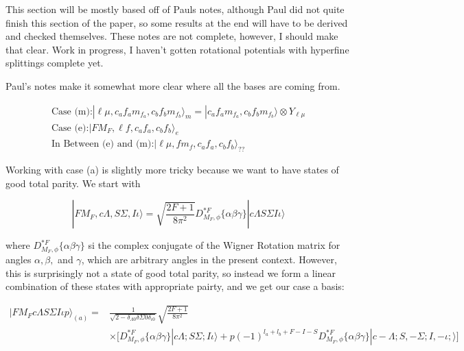 \documentclass[prl, longbibliography]{revtex4-2}
\begin{document}
This section will be mostly based off of Pauls notes, although Paul did not quite finish this section of the paper, so some results at the end will have to be derived and checked themselves. These notes are not complete, however, I should make that clear. Work in progress, I haven't gotten rotational potentials with hyperfine splittings complete yet. 

Paul's notes make it somewhat more clear where all the bases are coming from. 

\begin{equation}
\begin{split}
\text{Case (m):} |\ell \mu, c_a f_a m_{f_a}, c_b f_b m_{f_b}\rangle_m = |c_a f_a m_{f_a}, c_b f_b m_{f_b}\rangle\otimes Y_{\ell \mu}\\
\text{Case (e):} |F M_F, \ell f, c_a f_a, c_b f_b\rangle_e\\
\text{In Between (e) and (m):} |\ell\mu, f m_f, c_a f_a, c_b f_b\rangle_{??}
\end{split}
\end{equation}

Working with case (a) is slightly more tricky because we want to have states of good total parity. We start with

\begin{equation}
|F M_F, c \Lambda, S \Sigma, I \iota\rangle = \sqrt{\frac{2F+1}{8\pi^2}} D_{M_F,\phi}^{* F}\{\alpha \beta \gamma\} |c\Lambda S\Sigma I \iota\rangle
\end{equation}

where $D_{M_F,\phi}^{* F}\{\alpha \beta \gamma\}$ si the complex conjugate of the Wigner Rotation matrix for angles $\alpha, \beta, $ and $\gamma$, which are arbitrary angles in the present context. However, this is surprisingly not a state of good total parity, so instead we form a linear combination of these states with appropriate pairty, and we get our case a basis:

\begin{equation}
\begin{split}
|F M_F c \Lambda S \Sigma I \iota p\rangle_{(a)} = &\frac{1}{\sqrt{2-\delta_{\Lambda 0}\delta{\Sigma 0}\delta_{\iota 0}}} \sqrt{\frac{2F+1}{8\pi^2}}\\
&\times\Bigg[D_{M_F,\phi}^{* F}\{\alpha \beta \gamma\} |c\Lambda ;S\Sigma; I \iota\rangle
+p(-1)^{l_a+l_b+F-I-S}D_{M_F,\phi}^{* F}\{\alpha \beta \gamma\} |c-\Lambda; S,-\Sigma; I, -\iota;\rangle\Bigg]
\end{split}
\end{equation}
\end{document}
